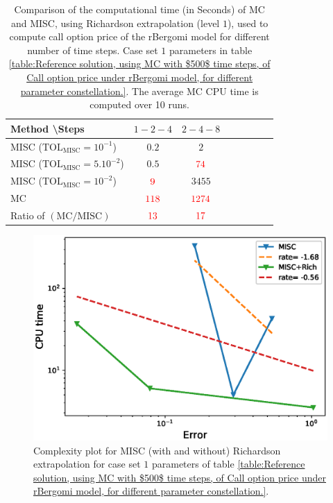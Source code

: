 \begin{table}[!h]
	\centering
	\begin{tabular}{l*{6}{c}r}
		Method \textbackslash  Steps            & $1-2-4$ & $2-4-8$   \\
		\hline
		MISC ($\text{TOL}_{\text{MISC}}=10^{-1}$)  & $0.2$ & $2$ &   \\
		MISC ($\text{TOL}_{\text{MISC}}=5.10^{-2}$)  & $0.5$ & ${\color{red}74}$  \\
		MISC ($\text{TOL}_{\text{MISC}}=10^{-2}$)  & ${\color{red}9}$ & $3455$   \\
		\hline
		MC    & $ {\color{red}  118}$  & ${\color{red}1274}$  \\
		
		\hline
		Ratio of $\left(\text{MC}/ \text{MISC} \right)$  &${\color{red}13}$ & ${\color{red}  17}$   \\
		\hline
	\end{tabular}
	\caption{Comparison of the computational time (in Seconds) of  MC and MISC, using Richardson extrapolation (level $1$), used to compute call option price of the rBergomi model for different number of time steps. Case set $1$ parameters in table \ref{table:Reference solution, using MC with $500$ time steps, of Call option price under rBergomi model, for different parameter constellation.}. The
		average MC CPU time is computed over 10 runs.}
	\label{Comparsion of the computational time of  MC and MISC, using Richardson extrapolation (level $2$), used to compute Call option price of rBergomi model for different number of time steps. Case set $2$ parameters,linear}
\end{table}
\FloatBarrier

\begin{figure}[h!]
	\centering
	\includegraphics[width=0.35\linewidth]{./figures/rBergomi_Complexity_rates/set2/error_vs_time_set2_comparison_linear}
	
	\caption{Complexity plot for  MISC (with and without) Richardson extrapolation for case set $1$ parameters of table \ref{table:Reference solution, using MC with $500$ time steps, of Call option price under rBergomi model, for different parameter constellation.}.}
	\label{fig:Complexity plot for  MISC for Case set $2$ parameters, comparison}
\end{figure}




